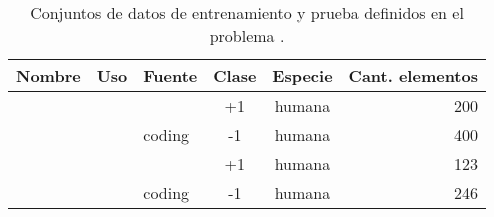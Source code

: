 %
\begin{table}[h]
  \tableStyle
  \begin{tabular}{lllScr}
    \toprule
    Nombre & Uso & Fuente &{Clase}& Especie & Cant. elementos \\
    \midrule
     & 
    &         & +1    & humana  & 200             \\
    && coding             & -1    & humana  & 400             \\
    \midrule
     & 
    &         & +1    & humana  & 123             \\
    && coding             & -1    & humana  & 246             \\
    \bottomrule
  \end{tabular}
  \caption{\captionStyle Conjuntos de datos de entrenamiento y prueba
    definidos en el problema \sbs{\mipred}.}
  \label{tbl:pruebasng}
\end{table}
%
